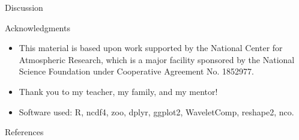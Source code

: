 \documentclass{beamer}
\begin{document}
\begin{frame}{Discussion}

\end{frame}

\begin{frame}{Acknowledgments}
  \begin{itemize}
  \item This material is based upon work supported by the National Center for Atmospheric Research, which is a major facility sponsored by the National Science Foundation under Cooperative Agreement No. 1852977.
  \item Thank you to my teacher, my family, and my mentor!
  \item Software used: R, ncdf4, zoo, dplyr, ggplot2, WaveletComp, reshape2, nco.
  \end{itemize}
\end{frame}

\begin{frame}{References}
  
  \fontsize{5pt}{6}\selectfont
  
\end{frame}
\end{document}
